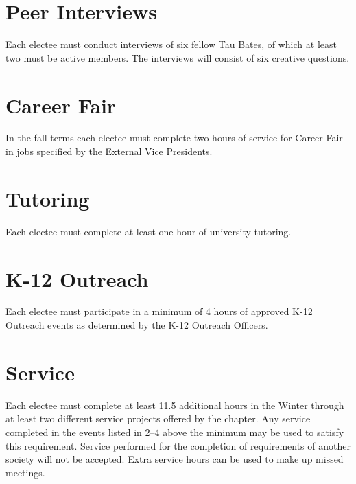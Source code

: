\section{Peer Interviews} Each electee must conduct interviews of six fellow Tau Bates, of which at least two must be active members. The interviews will consist of six creative questions. 
\section{Career Fair}\label{ugrad:CF} In the fall terms each electee must complete two hours of service for Career Fair in jobs specified by the External Vice Presidents. 
\section{Tutoring} Each electee must complete at least one hour of university tutoring. %
\section{K-12 Outreach} \label{ugrad:MindSET} Each electee must participate in a minimum of 4 hours of approved K-12 Outreach events as determined by the K-12 Outreach Officers. %
\section{Service} Each electee must complete at least 11.5 additional hours in the Winter through at least two different service projects offered by the chapter. Any service completed in the events listed in \ref{ugrad:CF}--\ref{ugrad:MindSET} above the minimum may be used to satisfy this requirement.  Service performed for the completion of requirements of another society will not be accepted. Extra service hours can be used to make up missed meetings. %


